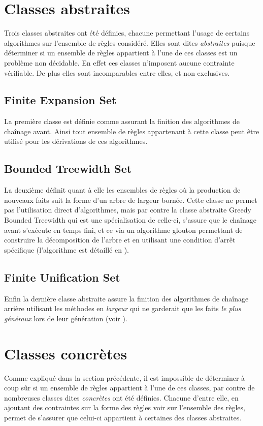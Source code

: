 
\section{Classes abstraites}\label{classes_abstraites}
Trois classes abstraites ont été définies, chacune permettant l'usage de certains
algorithmes sur l'ensemble de règles considéré.
Elles sont dites {\em abstraites} puisque déterminer si un ensemble de règles appartient
à l'une de ces classes est un problème non décidable. En effet ces classes n'imposent
aucune contrainte vérifiable.
De plus elles sont incomparables entre elles, et non exclusives. 

\subsection{Finite Expansion Set}\label{classes_abstraites_fus}
La première classe est définie comme assurant la finition des algorithmes de chaînage
avant. Ainsi tout ensemble de règles appartenant à cette classe peut être utilisé pour
les dérivations de ces algorithmes.

\subsection{Bounded Treewidth Set}\label{classes_abstraites_bts}
La deuxième définit quant à elle 
les ensembles de règles où la production de nouveaux faits suit la
forme d'un arbre de largeur bornée.
Cette classe ne permet pas l'utilisation direct d'algorithmes, mais par contre la classe
abstraite Greedy Bounded Treewidth qui est une spécialisation de celle-ci, s'assure que
le chaînage avant s'exécute en temps fini, et ce via un algorithme glouton permettant de
construire la décomposition de l'arbre et en utilisant une condition d'arrêt spécifique
(l'algorithme est détaillé en \cite{walking}).

\subsection{Finite Unification Set}\label{classes_abstraites_fes}
Enfin la dernière classe abstraite assure la finition des algorithmes de chaînage
arrière utilisant les méthodes en {\em largeur} qui ne garderait que les faits {\em le plus
généraux} lors de leur génération (voir \cite{ontological11}).


\section{Classes concrètes}\label{classes_concretes}
Comme expliqué dans la section précédente, il est impossible de déterminer à coup sûr 
si un ensemble
de règles appartient à l'une de ces classes, par contre de nombreuses classes dites
{\em concrètes }
ont été définies. Chacune d'entre elle, en ajoutant des contraintes sur la forme des
règles voir sur l'ensemble des règles, 
permet de s'assurer que celui-ci appartient à certaines des classes
abstraites.

